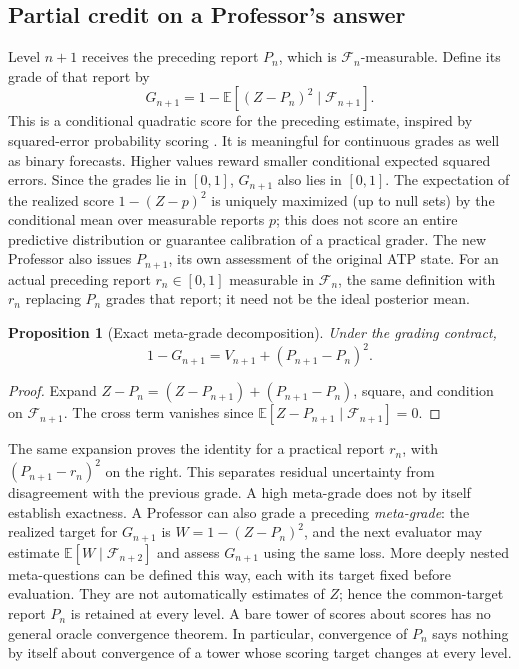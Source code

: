 \documentclass[11pt,letterpaper]{article}
\newtheorem{proposition}[theorem]{Proposition}
\theoremstyle{definition}\newtheorem{definition}[theorem]{Definition}\newtheorem{example}[theorem]{Example}\newtheorem{conjecture}[theorem]{Conjecture}
\newcommand{\E}{\mathbb E}\newcommand{\PP}{\mathbb P}\newcommand{\F}{\mathcal F}\newcommand{\Var}{\operatorname{Var}}\newcommand{\PC}{\operatorname{PC}}\newcommand{\N}{\mathbb N}
\begin{document}
\subsection{Partial credit on a Professor's answer}
Level $n+1$ receives the preceding report $P_n$, which is $\F_n$-measurable. Define its grade of that report by
\begin{equation}\label{eq:metagrade}
 G_{n+1}=1-\E[(Z-P_n)^2\mid\F_{n+1}].
\end{equation}
This is a conditional quadratic score for the preceding estimate, inspired by squared-error probability scoring \cite{brier}. It is meaningful for continuous grades as well as binary forecasts. Higher values reward smaller conditional expected squared errors. Since the grades lie in $[0,1]$, $G_{n+1}$ also lies in $[0,1]$. The expectation of the realized score $1-(Z-p)^2$ is uniquely maximized (up to null sets) by the conditional mean over measurable reports $p$; this does not score an entire predictive distribution or guarantee calibration of a practical grader. The new Professor also issues $P_{n+1}$, its own assessment of the original ATP state. For an actual preceding report $r_n\in[0,1]$ measurable in $\F_n$, the same definition with $r_n$ replacing $P_n$ grades that report; it need not be the ideal posterior mean.
\begin{proposition}[Exact meta-grade decomposition]\label{prop:meta}
Under the grading contract,
\[
 1-G_{n+1}=V_{n+1}+(P_{n+1}-P_n)^2.
\]
\end{proposition}
\begin{proof}
Expand $Z-P_n=(Z-P_{n+1})+(P_{n+1}-P_n)$, square, and condition on $\F_{n+1}$. The cross term vanishes since $\E[Z-P_{n+1}\mid\F_{n+1}]=0$.
\end{proof}
The same expansion proves the identity for a practical report $r_n$, with $(P_{n+1}-r_n)^2$ on the right. This separates residual uncertainty from disagreement with the previous grade. A high meta-grade does not by itself establish exactness. A Professor can also grade a preceding \emph{meta-grade}: the realized target for $G_{n+1}$ is $W=1-(Z-P_n)^2$, and the next evaluator may estimate $\E[W\mid\F_{n+2}]$ and assess $G_{n+1}$ using the same loss. More deeply nested meta-questions can be defined this way, each with its target fixed before evaluation. They are not automatically estimates of $Z$; hence the common-target report $P_n$ is retained at every level. A bare tower of scores about scores has no general oracle convergence theorem. In particular, convergence of $P_n$ says nothing by itself about convergence of a tower whose scoring target changes at every level.
\end{document}
